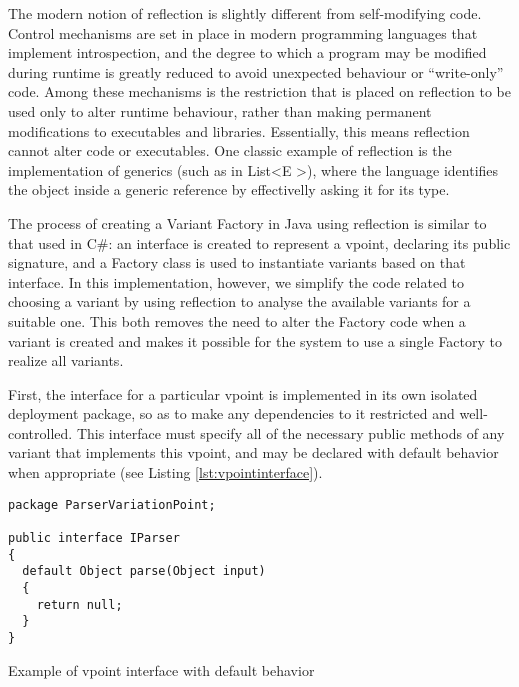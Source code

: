 The modern notion of reflection is slightly different from self-modifying code. Control mechanisms are set in place in modern programming languages that implement introspection, and the degree to which a program may be modified during runtime is greatly reduced to avoid unexpected behaviour or ``write-only'' code. Among these mechanisms is the restriction that is placed on reflection to be used only to alter runtime behaviour, rather than making permanent modifications to executables and libraries. Essentially, this means reflection cannot alter code or executables. One classic example of reflection is the implementation of generics (such as in List\textless E \textgreater), where the language identifies the object inside a generic reference by effectivelly asking it for its type.

 The process of creating a Variant Factory in Java using reflection is similar to that used in C\#: an interface is created to represent a \gls{vpoint}, declaring its public signature, and a Factory class is used to instantiate \gls{variant}s based on that interface. In this implementation, however, we simplify the code related to choosing a \gls{variant} by using reflection to analyse the available \gls{variant}s for a suitable one. This both removes the need to alter the Factory code when a \gls{variant} is created and makes it possible for the system to use a single Factory to realize all \gls{variant}s.

First, the interface for a particular \gls{vpoint} is implemented in its own isolated deployment package, so as to make any dependencies to it restricted and well-controlled. This interface must specify all of the necessary public methods of any \gls{variant} that implements this \gls{vpoint}, and may be declared with default behavior when appropriate (see Listing \ref{lst:vpointinterface}).

\begin{listing}
\begin{verbatim}
package ParserVariationPoint;

public interface IParser
{
  default Object parse(Object input)
  {
    return null;
  }
}
\end{verbatim}
\caption{Example of \gls{vpoint} interface with default behavior} \label{lst:vpointinterface}
\end{listing}

